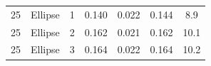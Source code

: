 \begin{table}[t]
\begin{tabular}{c c c c c c c}
\hspace{-2mm}25 & Ellipse          & 1 & 0.140 & 0.022 & 0.144 & \hspace{-2mm}8.9\\
\hspace{-2mm}25 & Ellipse          & 2 & 0.162 & 0.021 & 0.162 & \hspace{-2mm}10.1\\
\hspace{-2mm}25 & Ellipse          & 3 & 0.164 & 0.022 & 0.164 & \hspace{-2mm}10.2\\ 
\hline
\end{tabular}
\label{table:control}
\vspace{-4mm}
\end{table}

